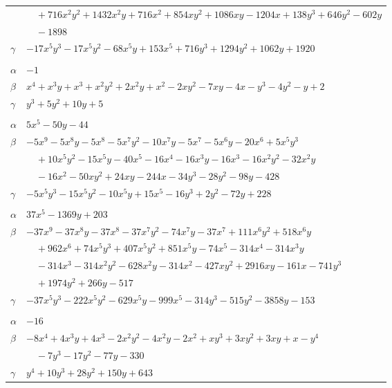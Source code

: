 \documentclass[11pt]{article}
\begin{document}
\begin{longtable}{@{}ll@{}}
 & $\quad +716x^{2}y^{2}+1432x^{2}y+716x^{2}+854xy^{2}+1086xy-1204x+138y^{3}+646y^{2}-602y$\\
 & $\quad -1898$\\
$\gamma$ & $-17x^{5}y^{3}-17x^{5}y^{2}-68x^{5}y+153x^{5}+716y^{3}+1294y^{2}+1062y+1920$\\
\addlinespace[3pt]
\multicolumn{2}{@{}l}{$\{i,j\}=\{10,36\}$, $k_{ij}=2$}\\
$\alpha$ & $-1$\\
$\beta$ & $x^{4}+x^{3}y+x^{3}+x^{2}y^{2}+2x^{2}y+x^{2}-2xy^{2}-7xy-4x-y^{3}-4y^{2}-y+2$\\
$\gamma$ & $y^{3}+5y^{2}+10y+5$\\
\addlinespace[3pt]
\multicolumn{2}{@{}l}{$\{i,j\}=\{10,39\}$, $k_{ij}=2^{2}\cdot 3^{2}\cdot 17$}\\
$\alpha$ & $5x^{5}-50y-44$\\
$\beta$ & $-5x^{9}-5x^{8}y-5x^{8}-5x^{7}y^{2}-10x^{7}y-5x^{7}-5x^{6}y-20x^{6}+5x^{5}y^{3}$\\
 & $\quad +10x^{5}y^{2}-15x^{5}y-40x^{5}-16x^{4}-16x^{3}y-16x^{3}-16x^{2}y^{2}-32x^{2}y$\\
 & $\quad -16x^{2}-50xy^{2}+24xy-244x-34y^{3}-28y^{2}-98y-428$\\
$\gamma$ & $-5x^{5}y^{3}-15x^{5}y^{2}-10x^{5}y+15x^{5}-16y^{3}+2y^{2}-72y+228$\\
\addlinespace[3pt]
\multicolumn{2}{@{}l}{$\{i,j\}=\{10,40\}$, $k_{ij}=2^{4}\cdot 3^{2}\cdot 5$}\\
$\alpha$ & $37x^{5}-1369y+203$\\
$\beta$ & $-37x^{9}-37x^{8}y-37x^{8}-37x^{7}y^{2}-74x^{7}y-37x^{7}+111x^{6}y^{2}+518x^{6}y$\\
 & $\quad +962x^{6}+74x^{5}y^{3}+407x^{5}y^{2}+851x^{5}y-74x^{5}-314x^{4}-314x^{3}y$\\
 & $\quad -314x^{3}-314x^{2}y^{2}-628x^{2}y-314x^{2}-427xy^{2}+2916xy-161x-741y^{3}$\\
 & $\quad +1974y^{2}+266y-517$\\
$\gamma$ & $-37x^{5}y^{3}-222x^{5}y^{2}-629x^{5}y-999x^{5}-314y^{3}-515y^{2}-3858y-153$\\
\addlinespace[3pt]
\multicolumn{2}{@{}l}{$\{i,j\}=\{11,14\}$, $k_{ij}=2^{6}\cdot 5^{2}$}\\
$\alpha$ & $-16$\\
$\beta$ & $-8x^{4}+4x^{3}y+4x^{3}-2x^{2}y^{2}-4x^{2}y-2x^{2}+xy^{3}+3xy^{2}+3xy+x-y^{4}$\\
 & $\quad -7y^{3}-17y^{2}-77y-330$\\
$\gamma$ & $y^{4}+10y^{3}+28y^{2}+150y+643$\\

\end{longtable}
\end{document}
